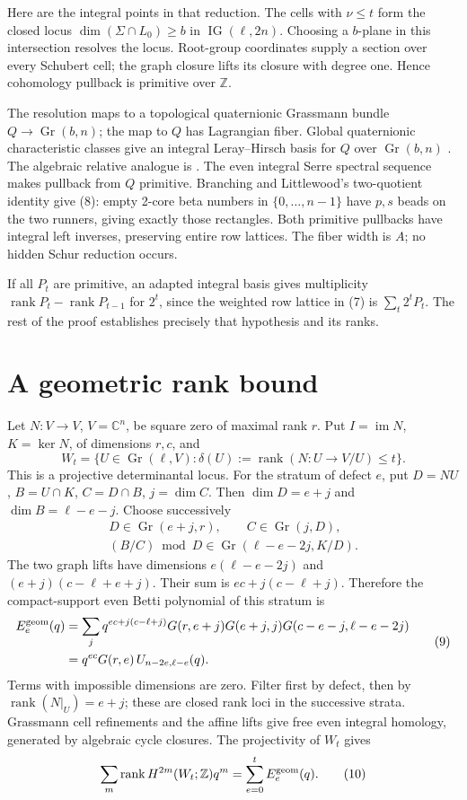 \documentclass[11pt,letterpaper]{article}
\newcommand{\Z}{\mathbb Z}
\newcommand{\C}{\mathbb C}
\newcommand{\IG}{\operatorname{IG}}
\newcommand{\Gr}{\operatorname{Gr}}
\newcommand{\rank}{\operatorname{rank}}
\begin{document}
Here are the integral points in that reduction. The cells with
\(\nu\le t\) form the closed locus
\(\dim(\Sigma\cap L_0)\ge b\) in \(\IG(\ell,2n)\).
Choosing a \(b\)-plane in this intersection resolves the locus.
Root-group coordinates supply a section over every Schubert cell;
the graph closure lifts its closure with degree one.
Hence cohomology pullback is primitive over \(\Z\).

The resolution maps to a topological quaternionic Grassmann bundle
\(Q\to\Gr(b,n)\); the map to \(Q\) has Lagrangian fiber.
Global quaternionic characteristic classes give an integral
Leray--Hirsch basis for \(Q\) over \(\Gr(b,n)\) \cite{PR}.
The algebraic relative analogue is \cite{PW}.
The even integral Serre spectral sequence makes pullback from \(Q\)
primitive.
Branching and Littlewood's two-quotient identity \cite{Wildon}
give (8): empty 2-core beta numbers in \(\{0,\ldots,n-1\}\)
have \(p,s\) beads on the two runners, giving exactly those rectangles.
Both primitive pullbacks have integral left inverses, preserving entire
row lattices. The fiber width is \(A\); no hidden Schur reduction occurs.

If all \(P_t\) are primitive, an adapted integral basis gives
multiplicity \(\rank P_t-\rank P_{t-1}\) for \(2^t\), since the
weighted row lattice in (7) is \(\sum_t2^tP_t\).
The rest of the proof establishes precisely that hypothesis and its ranks.

\newpage
\section{A geometric rank bound}
Let \(N:V\to V\), \(V=\C^n\), be square zero of maximal rank \(r\).
Put \(I=\operatorname{im}N\), \(K=\ker N\), of dimensions \(r,c\), and
\[
 W_t=\{U\in\Gr(\ell,V):
              \delta(U):=\rank(N:U\to V/U)\le t\}.
\]
This is a projective determinantal locus.
For the stratum of defect \(e\), put
\(D=NU\), \(B=U\cap K\), \(C=D\cap B\), \(j=\dim C\).
Then \(\dim D=e+j\) and \(\dim B=\ell-e-j\).
Choose successively
\[
 \begin{gathered}
 D\in\Gr(e+j,r),\qquad C\in\Gr(j,D),\\
 (B/C)\bmod D\in\Gr(\ell-e-2j,K/D).
 \end{gathered}
\]
The two graph lifts have dimensions \(e(\ell-e-2j)\) and
\((e+j)(c-\ell+e+j)\). Their sum is \(ec+j(c-\ell+j)\).
Therefore the compact-support even Betti polynomial of this stratum is
\[
 \begin{aligned}
 E_e^{\rm geom}(q)
 &=\sum_j q^{ec+j(c-\ell+j)}
       G(r,e+j)G(e+j,j)G(c-e-j,\ell-e-2j)\\
 &=q^{ec}G(r,e)\,U_{n-2e,\ell-e}(q).
 \end{aligned} \tag{9}
\]
Terms with impossible dimensions are zero.
Filter first by defect, then by \(\rank(N|_U)=e+j\);
these are closed rank loci in the successive strata.
Grassmann cell refinements and the affine lifts give free even integral
homology, generated by algebraic cycle closures.
The projectivity of \(W_t\) gives
\[
 \sum_m\rank H^{2m}(W_t;\Z)q^m=\sum_{e=0}^t E_e^{\rm geom}(q).
 \tag{10}
\]
\end{document}
